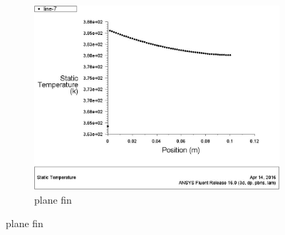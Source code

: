  \begin{figure}[h]
 	\centering
 	 	 	\begin{subfigure}[b]{0.5\textwidth}
 	 	 		\includegraphics[width=\textwidth]{126.jpg}
 	 	 		\caption{plane fin}
 	 	 		\label{fig:structured}
 	 	 	\end{subfigure}%
 	 	 	

\end{figure}
